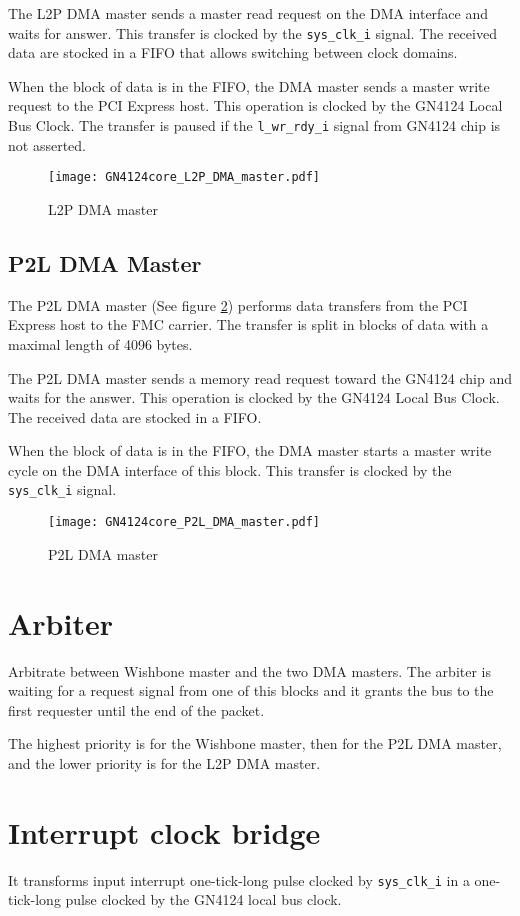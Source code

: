 \documentclass[10pt,a4paper]{cerndoc}
\begin{document}
The L2P DMA master sends a master read request on the DMA interface and waits for answer. This transfer is clocked by the \verb+sys_clk_i+ signal. The received data are stocked in a FIFO that allows switching between clock domains.

When the block of data is in the FIFO, the DMA master sends a master write request to the PCI Express host. This operation is clocked by the GN4124 Local Bus Clock. The transfer is paused if the \verb+l_wr_rdy_i+ signal from GN4124 chip is not asserted.



\begin{figure}[!ht]
	\centering
		\texttt{[image: GN4124core\_L2P\_DMA\_master.pdf]}
	\caption{L2P DMA master}
	\label{fig:GN4124core_l2p_dma_master}
\end{figure}

 \subsection{P2L DMA Master}
The P2L DMA master (See figure \ref{fig:GN4124core_p2l_dma_master}) performs data transfers from the PCI Express host to the FMC carrier. The transfer is split in blocks of data with a maximal length of 4096 bytes.

The P2L DMA master sends a memory read request toward the GN4124 chip and waits for the answer. This operation is clocked by the GN4124 Local Bus Clock. The received data are stocked in a FIFO.

When the block of data is in the FIFO, the DMA master starts a master write cycle on the DMA interface of this block. This transfer is clocked by the \verb+sys_clk_i+ signal.

  \begin{figure}[!ht]
	\centering
		\texttt{[image: GN4124core\_P2L\_DMA\_master.pdf]}
	\caption{P2L DMA master}
	\label{fig:GN4124core_p2l_dma_master}
\end{figure}

 \section{Arbiter}
Arbitrate between Wishbone master and the two DMA masters. The arbiter is waiting for a request signal from one of this blocks and it grants the bus to the first requester until the end of the packet.

The highest priority is for the Wishbone master, then for the P2L DMA master, and the lower priority is for the L2P DMA master.

  \section{Interrupt clock bridge}
  It transforms input interrupt one-tick-long pulse clocked by \verb+sys_clk_i+ in a one-tick-long pulse clocked by the GN4124 local bus clock.
\end{document}
